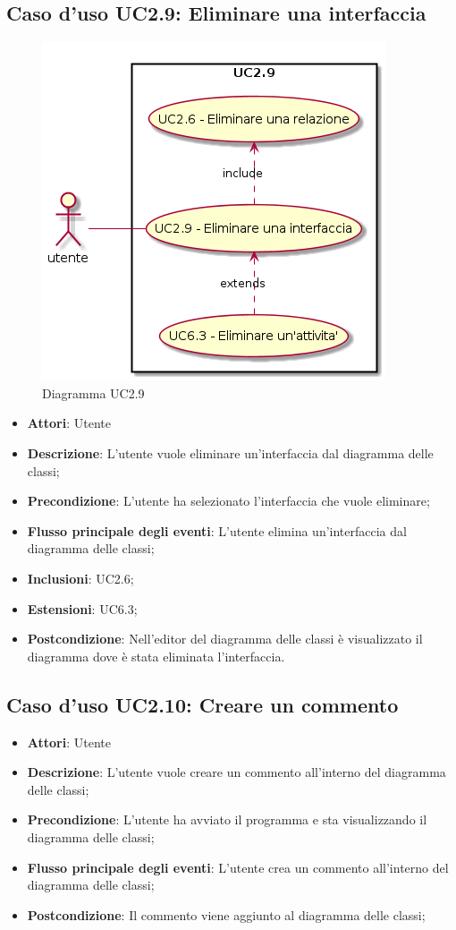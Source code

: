 \documentclass[../AnalisiDeiRequisiti.tex]{subfiles}
\begin{document}
		\subsection{Caso d'uso UC2.9: Eliminare una interfaccia}
		\begin{figure} [H]
			\centering
			\includegraphics[scale=0.45]{./Figures/UC2_9.png}
			\caption{Diagramma UC2.9}\label{}
		\end{figure}
		\begin{itemize}
			\item \textbf{Attori}: Utente
			\item \textbf{Descrizione}: L'utente vuole eliminare un'interfaccia dal diagramma delle classi;
			\item \textbf{Precondizione}: L'utente ha selezionato l'interfaccia che vuole eliminare;
			\item \textbf{Flusso principale degli eventi}: L'utente elimina un'interfaccia dal diagramma delle classi;
			\item \textbf{Inclusioni}: UC2.6;
			\item \textbf{Estensioni}: UC6.3;
			\item \textbf{Postcondizione}: Nell'editor del diagramma delle classi è visualizzato il diagramma dove è stata eliminata l'interfaccia.
		\end{itemize}
		\subsection{Caso d'uso UC2.10: Creare un commento}
		\begin{itemize}
			\item \textbf{Attori}: Utente
			\item \textbf{Descrizione}: L'utente vuole creare un commento all'interno del diagramma delle classi;
			\item \textbf{Precondizione}: L'utente ha avviato il programma e sta visualizzando il diagramma delle classi;
			\item \textbf{Flusso principale degli eventi}: L'utente crea un commento all'interno del diagramma delle classi;
			\item \textbf{Postcondizione}: Il commento viene aggiunto al diagramma delle classi;
		\end{itemize}
\end{document}
